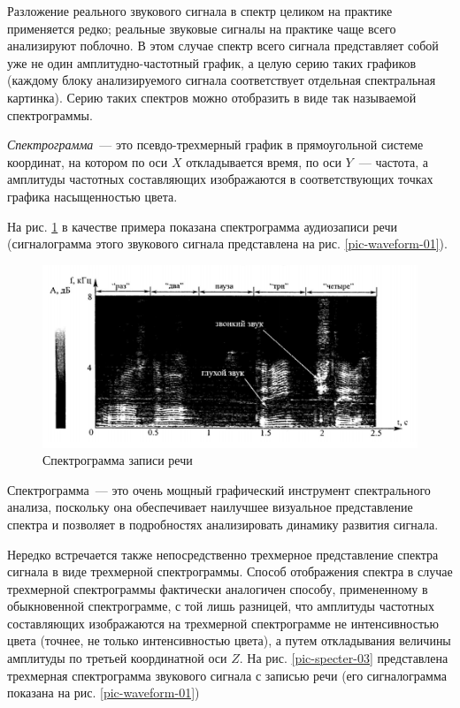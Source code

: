 \documentclass[oneside, final, 14pt]{extreport}
\begin{document}
Разложение реального звукового сигнала в спектр целиком на практике применяется редко; реальные звуковые сигналы на практике чаще всего анализируют поблочно. В этом случае спектр всего сигнала представляет собой уже не один амплитудно-частотный график, а целую серию таких графиков (каждому блоку анализируемого сигнала соответствует отдельная спектральная картинка). Серию таких спектров можно отобразить в виде так называемой спектрограммы.

{\itshape Спектрограмма}~--- это псевдо-трехмерный график в прямоугольной системе координат, на котором по оси \(X\) откладывается время, по оси \(Y\)~--- частота, а амплитуды частотных составляющих изображаются в соответствующих точках графика насыщенностью цвета.

На рис. \ref{pic-specter-02} в качестве примера показана спектрограмма аудиозаписи речи (сигналограмма этого звукового сигнала представлена на рис. \ref{pic-waveform-01}).

\begin{figure}[h]
\centering
\includegraphics{pic-specter-02}
\caption{Спектрограмма записи речи}
\label{pic-specter-02}
\end{figure}

Спектрограмма~--- это очень мощный графический инструмент спектрального анализа, поскольку она обеспечивает наилучшее визуальное представление спектра и позволяет в подробностях анализировать динамику развития сигнала.

Нередко встречается также непосредственно трехмерное представление спектра сигнала в виде трехмерной спектрограммы. Способ отображения спектра в случае трехмерной спектрограммы фактически аналогичен способу, примененному в обыкновенной спектрограмме, с той лишь разницей, что амплитуды частотных составляющих изображаются на трехмерной спектрограмме не интенсивностью цвета (точнее, не только интенсивностью цвета), а путем откладывания величины амплитуды по третьей координатной оси \(Z\). На рис. \ref{pic-specter-03} представлена трехмерная спектрограмма звукового сигнала с записью речи (его сигналограмма показана на рис. \ref{pic-waveform-01})
\end{document}
